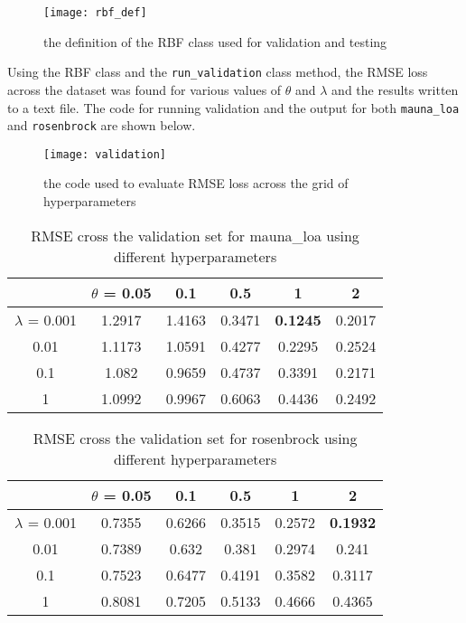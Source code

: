 \documentclass{article}
\begin{document}
\begin{figure}[H]
\centering
\texttt{[image: rbf\_def]}
\caption{the definition of the RBF class used for validation and testing}
\end{figure}

Using the RBF class and the \verb+run_validation+ class method, the RMSE loss across the dataset was found for various values of $\theta$ and $\lambda$ and the results written to a text file. The code for running validation and the output for both \verb+mauna_loa+ and \verb+rosenbrock+ are shown below.

\begin{figure}[H]
\centering
\texttt{[image: validation]}
\caption{the code used to evaluate RMSE loss across the grid of hyperparameters}
\end{figure}

\begin{table}[H]
\begin{center}
\begin{tabular}{|c|c|c|c|c|c|}
\hline
 & $\theta$ = 0.05 & 0.1 & 0.5 & 1 & 2 \\ \hline
 $\lambda$ = 0.001  & 1.2917 & 1.4163 & 0.3471 & \textbf{0.1245} & 0.2017\\ \hline
 0.01 & 1.1173 & 1.0591 & 0.4277 & 0.2295 & 0.2524\\ \hline
 0.1 & 1.082 & 0.9659 & 0.4737 & 0.3391 & 0.2171\\ \hline
 1 & 1.0992 & 0.9967 & 0.6063 & 0.4436 & 0.2492\\
 \hline
\end{tabular}
\caption{RMSE cross the validation set for mauna\_loa using different hyperparameters}
\end{center}
\end{table}

\begin{table}
\begin{center}
\begin{tabular}{|c|c|c|c|c|c|}
\hline
 & $\theta$ = 0.05 & 0.1 & 0.5 & 1 & 2 \\ \hline
 $\lambda$ = 0.001  & 0.7355 & 0.6266 & 0.3515 & 0.2572 & \textbf{0.1932}\\ \hline
 0.01 & 0.7389 & 0.632 & 0.381 & 0.2974 & 0.241\\ \hline
 0.1 & 0.7523 & 0.6477 & 0.4191 & 0.3582 & 0.3117\\ \hline
 1 & 0.8081 & 0.7205 & 0.5133 & 0.4666 & 0.4365\\
 \hline
\end{tabular}
\caption{RMSE cross the validation set for rosenbrock using different hyperparameters}
\end{center}
\end{table}
\end{document}
